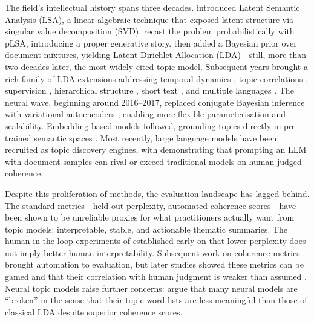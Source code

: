 \documentclass[11pt,a4paper]{article}
\begin{document}
The field's intellectual history spans three decades.
\textcite{deerwester1990indexing} introduced Latent Semantic Analysis
(LSA), a linear-algebraic technique that exposed latent structure via
singular value decomposition (SVD).
\textcite{hofmann1999probabilistic} recast the problem probabilistically
with pLSA, introducing a proper generative story.
\textcite{blei2003latent} then added a Bayesian prior over document
mixtures, yielding Latent Dirichlet Allocation (LDA)---still, more than
two decades later, the most widely cited topic model.
Subsequent years brought a rich family of LDA extensions addressing
temporal dynamics \parencite{blei2006dynamic}, topic correlations
\parencite{blei2005correlated}, supervision \parencite{blei2007supervised},
hierarchical structure \parencite{teh2006hierarchical}, short text
\parencite{yin2014dirichlet}, and multiple languages
\parencite{mimno2009polylingual}.
The neural wave, beginning around 2016--2017, replaced conjugate
Bayesian inference with variational autoencoders
\parencite{miao2016neural,srivastava2017autoencoding}, enabling more
flexible parameterisation and scalability.
Embedding-based models followed, grounding topics directly in
pre-trained semantic spaces \parencite{dieng2020topic,sia2020tired,
bianchi2021pretraining,grootendorst2022bertopic}.
Most recently, large language models have been recruited as topic
discovery engines, with \textcite{pham2024topicgpt} demonstrating that
prompting an LLM with document samples can rival or exceed traditional
models on human-judged coherence.

Despite this proliferation of methods, the evaluation landscape has
lagged behind.
The standard metrics---held-out perplexity, automated coherence
scores---have been shown to be unreliable proxies for what practitioners
actually want from topic models: interpretable, stable, and actionable
thematic summaries.
The human-in-the-loop experiments of \textcite{chang2009reading}
established early on that lower perplexity does not imply better human
interpretability.
Subsequent work on coherence metrics
\parencite{newman2010automatic,lau2014machine,roder2015exploring}
brought automation to evaluation, but later studies showed these metrics
can be gamed and that their correlation with human judgment is weaker
than assumed \parencite{hoyle2021automated,doogan2021twaddle}.
Neural topic models raise further concerns: \textcite{hoyle2022broken}
argue that many neural models are ``broken'' in the sense that their
topic word lists are less meaningful than those of classical LDA despite
superior coherence scores.
\end{document}
